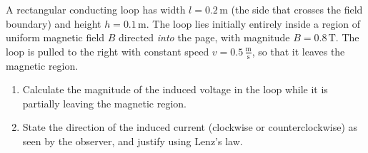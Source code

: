 \documentclass[11pt,a4paper]{article}
\newcounter{exercise}
\newenvironment{exercise}[1][]
  {\refstepcounter{exercise}%
   \begin{tcolorbox}[enhanced, breakable, width=\textwidth,
     colback=blue!5!white,colframe=blue!60!black,
     fonttitle=\bfseries\large,
     title=Exercise~\theexercise:~#1]}
  {\end{tcolorbox}}
\newif\ifshowsolutions
\newenvironment{solution}
  {\ifshowsolutions
     \begin{tcolorbox}[enhanced, breakable, width=\textwidth,
       colback=green!5!white,colframe=green!50!black,
       fonttitle=\bfseries\large,
       title=Solution]}
  {\end{tcolorbox}\fi}
\begin{document}
\begin{exercise}[Faraday's Law: Moving Conductor]
A rectangular conducting loop has width $l=0.2\,\text{m}$ (the side that crosses the field boundary) and height $h=0.1\,\text{m}$. The loop lies initially entirely inside a region of uniform magnetic field $B$ directed \emph{into} the page, with magnitude $B=0.8\,\text{T}$. The loop is pulled to the right with constant speed $v=0.5\,\frac{\text{m}}{\text{s}}$, so that it leaves the magnetic region.
\begin{enumerate}[label=\alph*)]
  \item Calculate the magnitude of the induced voltage in the loop while it is partially leaving the magnetic region.
  \item State the direction of the induced current (clockwise or counterclockwise) as seen by the observer, and justify using Lenz's law.
\end{enumerate}
\end{exercise}

\ifshowsolutions
\begin{solution}
Magnetic flux through the portion of the loop inside the field is $\Phi=B\,A_{\rm in}$. As the loop leaves, $A_{\rm in}$ decreases, so $d\Phi/dt<0$. Faraday's law gives
\[
V = -\frac{d\Phi}{dt}\,,
\]
and for the straight side moving at speed $v$ the magnitude of the induced voltage is
\[
|V| = B \cdot l \cdot v\,.
\]

\begin{enumerate}[label=\alph*)]
\item Magnitude:
\[
|V| = B \cdot l \cdot v = 0.8\,\text{T} \cdot 0.2\,\text{m} \cdot 0.5\,\frac{\text{m}}{\text{s}} = 0.08\,\text{V}
\]

\item Direction:
The magnetic flux (into the page) is decreasing as the loop leaves. By Lenz's law the induced current will produce a magnetic field that tries to maintain the lost flux — i.e., it will produce a magnetic field \emph{into} the page. The conducting loop can be interpreted as a mini electromagnet (coil). So, using the right-hand rule (curl the fingers in the direction of current; thumb gives the magnetic field), a magnetic field into the page corresponds to a clockwise current as seen by the observer. Thus the induced current is clockwise.
\end{enumerate}
\end{solution}
\fi
\end{document}
